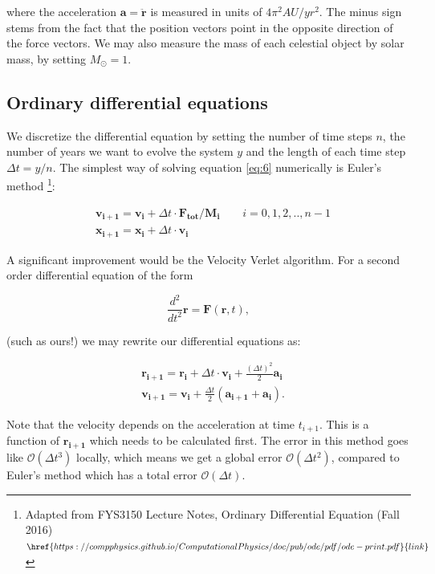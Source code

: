 \documentclass[%
 reprint,
 nobalance,
 amsmath,amssymb,
 aps,
]{revtex4-1}
\begin{document}
where the acceleration $\bm{a = \ddot r}$ is measured in units of $4\pi^{2} AU/yr^{2}$. The minus sign stems from the fact that the position vectors point in the opposite direction of the force vectors. We may also measure the mass of each celestial object by solar mass, by setting $M_{\odot} = 1$. \\

\subsection{\label{sec:ODE}Ordinary differential equations}
We discretize the differential equation by setting the number of time steps $n$, the number of years we want to evolve the system $y$ and the length of each time step $\Delta t = y/n$. The simplest way of solving equation \eqref{eq:6} numerically is Euler's method \footnote{Adapted from FYS3150 Lecture Notes, Ordinary Differential Equation (Fall 2016) $\href{https://compphysics.github.io/ComputationalPhysics/doc/pub/ode/pdf/ode-print.pdf}{link}$}:

\begin{equation}
\begin{split}
	& \bm{v_{i+1} = v_i} + \Delta t \cdot \bm{F_{tot}/M_i} \qquad i=0,1,2,..,{n-1} \\
	& \bm{x_{i+1} = x_{i}} + \Delta t \cdot \bm{v_i}
\end{split}
\end{equation}

A significant improvement would be the Velocity Verlet algorithm. For a second order differential equation of the form

\begin{equation}
	\frac{d^{2}}{dt^{2}}\bm{r} = \bm{F}(\bm{r}, t),
\end{equation}

(such as ours!) we may rewrite our differential equations as:

\begin{equation}
\begin{split}
	&\bm{r_{i+1} = r_i} + \Delta t \cdot \bm{v_i} + \frac{(\Delta t)^{2}}{2} \bm{a_i} \\
	& \bm{v_{i+1} = v_i} + \frac{\Delta t}{2}(\bm{a_{i+1} + a_i}).
\end{split}
\end{equation}

Note that the velocity depends on the acceleration at time $t_{i+1}$. This is a function of $\bm{r_{i+1}}$ which needs to be calculated first. The error in this method goes like $\mathcal{O}(\Delta t^{3})$ locally, which means we get a global error $\mathcal{O}(\Delta t^{2})$, compared to Euler's method which has a total error $\mathcal{O}(\Delta t)$.
\end{document}
